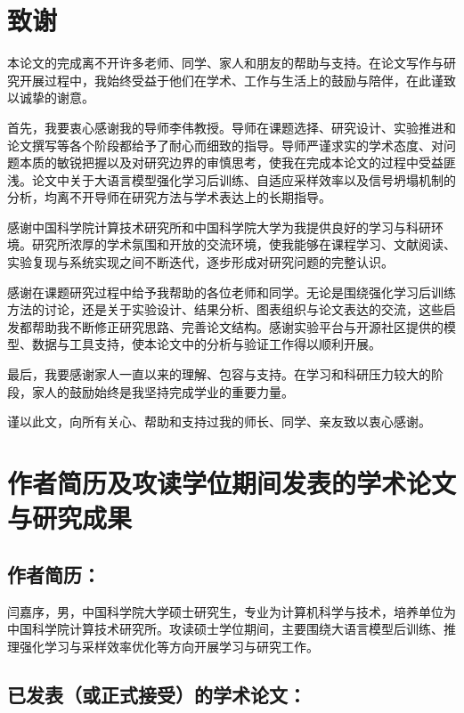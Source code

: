 \chapter[致谢]{致谢}

本论文的完成离不开许多老师、同学、家人和朋友的帮助与支持。在论文写作与研究开展过程中，我始终受益于他们在学术、工作与生活上的鼓励与陪伴，在此谨致以诚挚的谢意。

首先，我要衷心感谢我的导师李伟教授。导师在课题选择、研究设计、实验推进和论文撰写等各个阶段都给予了耐心而细致的指导。导师严谨求实的学术态度、对问题本质的敏锐把握以及对研究边界的审慎思考，使我在完成本论文的过程中受益匪浅。论文中关于大语言模型强化学习后训练、自适应采样效率以及信号坍塌机制的分析，均离不开导师在研究方法与学术表达上的长期指导。

感谢中国科学院计算技术研究所和中国科学院大学为我提供良好的学习与科研环境。研究所浓厚的学术氛围和开放的交流环境，使我能够在课程学习、文献阅读、实验复现与系统实现之间不断迭代，逐步形成对研究问题的完整认识。

感谢在课题研究过程中给予我帮助的各位老师和同学。无论是围绕强化学习后训练方法的讨论，还是关于实验设计、结果分析、图表组织与论文表达的交流，这些启发都帮助我不断修正研究思路、完善论文结构。感谢实验平台与开源社区提供的模型、数据与工具支持，使本论文中的分析与验证工作得以顺利开展。

最后，我要感谢家人一直以来的理解、包容与支持。在学习和科研压力较大的阶段，家人的鼓励始终是我坚持完成学业的重要力量。

谨以此文，向所有关心、帮助和支持过我的师长、同学、亲友致以衷心感谢。

\chapter{作者简历及攻读学位期间发表的学术论文与研究成果}

\section*{作者简历：}

闫嘉序，男，中国科学院大学硕士研究生，专业为计算机科学与技术，培养单位为中国科学院计算技术研究所。攻读硕士学位期间，主要围绕大语言模型后训练、推理强化学习与采样效率优化等方向开展学习与研究工作。

\section*{已发表（或正式接受）的学术论文：}


